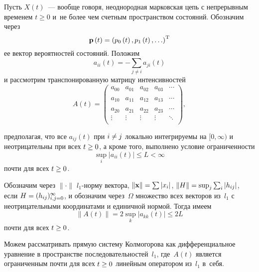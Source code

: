 \begin{multicols}{2}
Пусть $X(t)$~--- вообще говоря, неоднородная марковская цепь с непрерывным 
временем $t \ge 0$ и~не более чем счетным пространством состояний.  Обозначим 
через 
$$
{\mathbf p}\left(t\right) = \left(p_{0}\left(t\right), p_{1}\left(t\right), 
\ldots\right)^{\mathrm{T}}
$$ 
ее вектор вероятностей состояний. Положим  
$$
a_{ii}\left(t\right)  = -\sum\limits_{j\neq i} a_{ji}\left(t\right)
$$
 и рассмотрим транспонированную матрицу 
интенсивностей
        \begin{equation*}
    A(t)=       \left(
            \begin{array}{cccccccccccccc}
                a_{00} & a_{01}  & a_{02}  & a_{03}  & \cdots \\
                \\
                a_{10} & a_{11} & a_{12}   & a_{13}  & \cdots \\
                \\
                a_{20} & a_{21} & a_{22} & a_{23}    & \cdots \\
                \vdots   & \vdots & \vdots  & \vdots    & \ddots \\
            \end{array}
            \right),
        \end{equation*}
    
\noindent 
предполагая, что все  $a_{ij}\left(t\right)$ при $i\hm \neq j$ 
локально интегрируемы на $[0,\infty)$ и неотрицательны при всех $t\hm \ge 0$, а 
кроме того, выполнено условие ограниченности
    \begin{equation*}
        \sup\limits_i|a_{ii}\left(t\right)| \le  L < \infty 
    \end{equation*}
    \noindent почти для всех $t \hm\ge 0$.
    
    Обозначим через $ \|\cdot\| $ $ l_1 $-нор\-му вектора, 
$\|{\vx}\|\hm=\sum |x_i|$,
    $\|H\| \hm= \sup\nolimits_j \sum\nolimits_i |h_{ij}|$, если $H\hm = (h_{ij})_{i,j=0}^{\infty}$, и 
обозначим через~$\Omega $ множество всех векторов из~$l_1$ с неотрицательными 
координатами и единичной нормой. Тогда имеем 
$$
\|A(t)\| = 
2\sup\limits_{k}\left|a_{kk}\left(t\right)\right| \le 2L
$$ 
почти для всех $t \hm\ge 0$.
    
    Можем рассматривать прямую систему Колмогорова как дифференциальное 
уравнение в пространстве последовательностей~$l_1$, где~$A\left (t\right)$ 
является ограниченным почти для всех $ t \hm\ge 0 $ линейным оператором из~$l_1$ в~себя.
    

\end{multicols}
